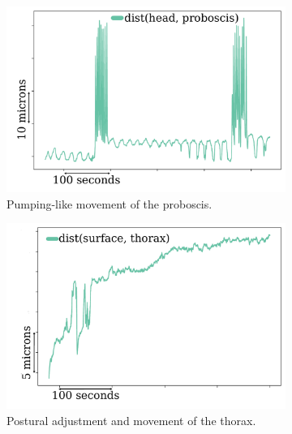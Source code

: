 \begin{figure}[ht!]
	\centering
	\begin{subfigure}[ht!]{0.32\linewidth}
		\centering\includegraphics[width=\linewidth]{figures/ExampleTrajectory-ProboscisPumping.pdf}
		\caption{Pumping-like movement of the proboscis.}
	\end{subfigure}%
	\hfill
	\centering
	\begin{subfigure}[ht!]{0.32\linewidth}
		\centering\includegraphics[width=\linewidth]{figures/ExampleTrajectory-PosturalAdjustment.pdf}
		\caption{Postural adjustment and movement of the thorax.}
	\end{subfigure}%
	\hfill
	\centering
	\begin{subfigure}[ht!]{0.32\linewidth}

\end{subfigure}
\end{figure}
